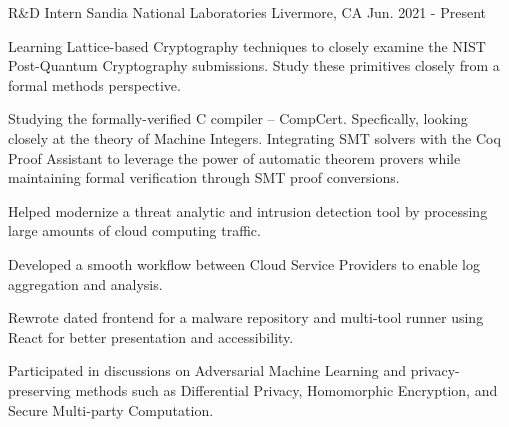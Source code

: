 

\begin{cventries}

  \cventry
    {R\&D Intern} %
    {Sandia National Laboratories} %
    {Livermore, CA} %
    {Jun. 2021 - Present} %
    {
      \begin{cvitems} %
        \item{Learning Lattice-based Cryptography techniques to closely examine the NIST Post-Quantum Cryptography submissions. Study these primitives closely from a formal methods perspective.}
        \item{Studying the formally-verified C compiler -- CompCert. Specfically, looking closely at the theory of Machine Integers. Integrating SMT solvers with the Coq Proof Assistant to leverage the power of automatic theorem provers while maintaining formal verification through SMT proof conversions. }
        \item{Helped modernize a threat analytic and intrusion detection tool by processing large amounts of cloud computing traffic.}
        \item{Developed a smooth workflow between Cloud Service Providers to enable log aggregation and analysis.}
        \item{Rewrote dated frontend for a malware repository and multi-tool runner using React for better presentation and accessibility.}
        \item{Participated in discussions on Adversarial Machine Learning and privacy-preserving methods such as Differential Privacy, Homomorphic Encryption, and Secure Multi-party Computation.}
      \end{cvitems}
    }


\end{cventries}
